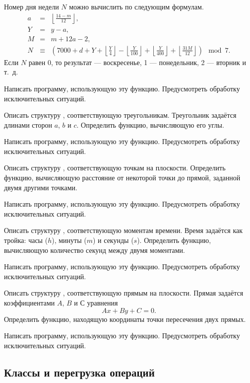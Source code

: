 Номер дня недели $N$ можно вычислить по следующим формулам.
\begin{eqnarray*}
a &=& \left\lfloor\frac{14 - m}{12}\right\rfloor,\\
Y &=& y - a,\\
M &=& m + 12a - 2,\\
N &\equiv& \left( 7000 + d + Y
+ \left\lfloor\frac{Y}{4}\right\rfloor
- \left\lfloor\frac{Y}{100}\right\rfloor
+ \left\lfloor\frac{Y}{400}\right\rfloor
+ \left\lfloor\frac{31M}{12}\right\rfloor
\right) \mod{7}.
\end{eqnarray*}
Если $N$ равен 0, то результат — воскресенье, 1 — понедельник, 2 —
вторник и т.~д.

Написать программу, использующую эту функцию. Предусмотреть обработку
исключительных ситуаций.

\task Описать структуру , соответствующую
треугольникам. Треугольник задаётся длинами сторон $a$, $b$ и $c$.
Определить функцию, вычисляющую его углы.

Написать программу, использующую эту функцию. Предусмотреть обработку
исключительных ситуаций.

\task Описать структуру , соответствующую точкам на
плоскости. Определить функцию, вычисляющую расстояние от некоторой
точки до прямой, заданной двумя другими точками.

Написать программу, использующую эту функцию. Предусмотреть обработку
исключительных ситуаций.

\task Описать структуру , соответствующую моментам
времени. Время задаётся как тройка: часы ($h$), минуты ($m$) и секунды
($s$). Определить функцию, вычисляющую количество секунд между двумя
моментами.

Написать программу, использующую эту функцию. Предусмотреть обработку
исключительных ситуаций.

\task Описать структуру , соответствующую прямым на
плоскости. Прямая задаётся коэффициентами $A$, $B$ и $С$ уравнения
\[
Ax+By+C=0.
\]
Определить функцию, находящую координаты точки пересечения двух
прямых.

Написать программу, использующую эту функцию. Предусмотреть обработку
исключительных ситуаций.


\subsection{Классы и перегрузка операций}

